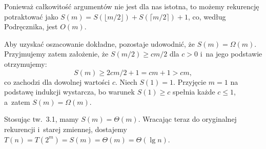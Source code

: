 Ponieważ całkowitość argumentów nie jest dla nas istotna, to możemy rekurencję potraktować jako $S(m)=S(\lfloor m/2\rfloor)+S(\lceil m/2\rceil)+1$, co, według Podręcznika, jest $O(m)$.

Aby uzyskać oszacowanie dokładne, pozostaje udowodnić, że $S(m)=\Omega(m)$.
Przyjmujemy zatem założenie, że $S(m/2)\ge cm/2$ dla $c>0$ i~na jego podstawie otrzymujemy:
\[
	S(m) \ge 2cm/2+1 = cm+1 > cm,
\]
co zachodzi dla dowolnej wartości $c$.
Niech $S(1)=1$.
Przyjęcie $m=1$ na podstawę indukcji wystarcza, bo warunek $S(1)\ge c$ spełnia każde $c\le1$, a~zatem $S(m)=\Omega(m)$.

Stosując tw.\ 3.1, mamy $S(m)=\Theta(m)$.
Wracając teraz do oryginalnej rekurencji i~starej zmiennej, dostajemy $T(n)=T(2^m)=S(m)=\Theta(m)=\Theta(\lg n)$.
